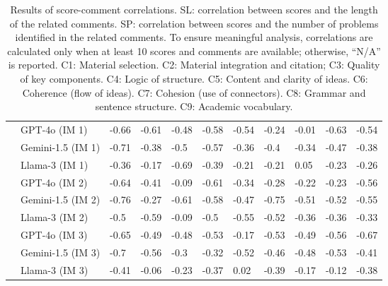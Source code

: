 \begin{table}[]
\begin{tabular}{lllllllllll}
   &     GPT-4o (IM 1) & -0.66 & -0.61 & -0.48 & -0.58 & -0.54 & -0.24 & -0.01 & -0.63 & -0.54 \\
   & Gemini-1.5 (IM 1) & -0.71 & -0.38 &  -0.5 & -0.57 & -0.36 &  -0.4 & -0.34 & -0.47 & -0.38 \\
   &    Llama-3 (IM 1) & -0.36 & -0.17 & -0.69 & -0.39 & -0.21 & -0.21 &  0.05 & -0.23 & -0.26 \\ [0.15cm]

   &     GPT-4o (IM 2) & -0.64 & -0.41 & -0.09 & -0.61 & -0.34 & -0.28 & -0.22 & -0.23 & -0.56 \\
   & Gemini-1.5 (IM 2) & -0.76 & -0.27 & -0.61 & -0.58 & -0.47 & -0.75 & -0.51 & -0.52 & -0.55 \\
   &    Llama-3 (IM 2) &  -0.5 & -0.59 & -0.09 &  -0.5 & -0.55 & -0.52 & -0.36 & -0.36 & -0.33 \\ [0.15cm]

   &     GPT-4o (IM 3) & -0.65 & -0.49 & -0.48 & -0.53 & -0.17 & -0.53 & -0.49 & -0.56 & -0.67 \\
   & Gemini-1.5 (IM 3) &  -0.7 & -0.56 &  -0.3 & -0.32 & -0.52 & -0.46 & -0.48 & -0.53 & -0.41 \\
   &    Llama-3 (IM 3) & -0.41 & -0.06 & -0.23 & -0.37 &  0.02 & -0.39 & -0.17 & -0.12 & -0.38 \\ [0.15cm]
\bottomrule
\end{tabular}
    
    \caption{Results of score-comment correlations. SL: correlation between scores and the length of the related comments. SP: correlation between scores and the number of problems identified in the related comments. To ensure meaningful analysis, correlations are calculated only when at least 10 scores and comments are available; otherwise, ``N/A'' is reported. C1: Material selection. C2: Material integration and citation; C3: Quality of key components. C4: Logic of structure. C5: Content and clarity of ideas. C6: Coherence (flow of ideas). C7: Cohesion (use of connectors). C8: Grammar and sentence structure. C9: Academic vocabulary.}
    \label{tab:scoreCommentCorr}
\end{table}

